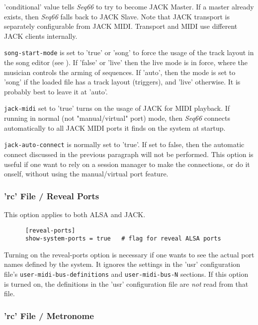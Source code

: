    'conditional' value tells \textsl{Seq66} to try to
   become JACK Master.  If a master already exists, then \textsl{Seq66} falls
   back to JACK Slave.
   Note that JACK transport is separately configurable from
   JACK MIDI. Transport and MIDI use different JACK clients internally.

   \texttt{song-start-mode} is set to 'true' or 'song' to force the usage of the
   track layout in the song editor (see ).
   If 'false' or 'live' then the live mode is in force, where the musician
   controls the arming of sequences.
   If 'auto', then the mode is set to 'song' if the loaded file has
   a track layout (triggers), and 'live' otherwise.
   It is probably best to leave it at 'auto'.

   \texttt{jack-midi} set to 'true' turns on the usage of JACK for MIDI
   playback.  If running in normal (not "manual/virtual" port) mode,
   then \textsl{Seq66} connects automatically to all JACK MIDI ports it
   finds on the system at startup.

   \texttt{jack-auto-connect} is normally set to 'true'.  If set to false, then
   the automatic connect discussed in the previous paragraph will not be
   performed.
   This option is useful if one want to rely on a session manager to make the
   connections, or do it onself, without using the manual/virtual port feature.

\subsubsection{'rc' File / Reveal Ports}
\label{subsubsec:configuration_rc_reveal_ports}

   This option applies to both ALSA and JACK.

   \begin{verbatim}
      [reveal-ports]
      show-system-ports = true   # flag for reveal ALSA ports
   \end{verbatim}

   Turning on the reveal-ports option is necessary if one
   wants to see the actual port names defined by the system.
   It ignores the settings in the 'usr' configuration file's
   \texttt{user-midi-bus-definitions} and \texttt{user-midi-bus-N} sections.
   If this option is turned on, the definitions in the
   'usr' configuration file are \textsl{not} read from that file.

\subsubsection{'rc' File / Metronome}
\label{subsubsec:configuration_rc_metronome}

